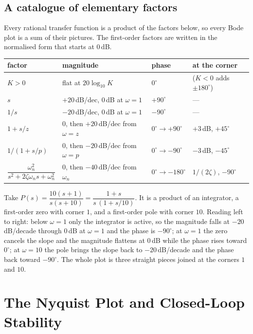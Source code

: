 \documentclass[11pt]{article}
\begin{document}
\subsection{A catalogue of elementary factors}\label{sec:catalogue}
Every rational transfer function is a product of the factors below, so every Bode
plot is a sum of their pictures. The first-order factors are written in the
normalised form that starts at $0$\,dB.

\begin{center}\small
\renewcommand{\arraystretch}{1.6}
\begin{tabular}{@{}llll@{}}
\toprule
factor & magnitude & phase & at the corner\\
\midrule
$K>0$ & flat at $20\log_{10}K$ & $0^\circ$ & ($K<0$ adds $\pm180^\circ$)\\
$s$ & $+20$\,dB/dec, $0$\,dB at $\omega=1$ & $+90^\circ$ & ---\\
$1/s$ & $-20$\,dB/dec, $0$\,dB at $\omega=1$ & $-90^\circ$ & ---\\
$1+s/z$ & $0$, then $+20$\,dB/dec from $\omega=z$ & $0^\circ\to+90^\circ$ & $+3$\,dB, $+45^\circ$\\
$1/(1+s/p)$ & $0$, then $-20$\,dB/dec from $\omega=p$ & $0^\circ\to-90^\circ$ & $-3$\,dB, $-45^\circ$\\
$\dfrac{\omega_n^{2}}{s^{2}+2\zeta\omega_n s+\omega_n^{2}}$ & $0$, then $-40$\,dB/dec from $\omega_n$ & $0^\circ\to-180^\circ$ & $1/(2\zeta)$, $-90^\circ$\\
\bottomrule
\end{tabular}
\end{center}

\begin{example}
Take $P(s)=\dfrac{10(s+1)}{s(s+10)}=\dfrac{1+s}{s\,(1+s/10)}$. It is a product of
an integrator, a first-order zero with corner $1$, and a first-order pole with corner
$10$. Reading left to right: below $\omega=1$ only the integrator is active, so the
magnitude falls at $-20$\,dB/decade through $0$\,dB at $\omega=1$ and the phase is
$-90^\circ$; at $\omega=1$ the zero cancels the slope and the magnitude flattens at
$0$\,dB while the phase rises toward $0^\circ$; at $\omega=10$ the pole brings the
slope back to $-20$\,dB/decade and the phase back toward $-90^\circ$. The whole
plot is three straight pieces joined at the corners $1$ and $10$.
\end{example}

\section{The Nyquist Plot and Closed-Loop Stability}\label{sec:nyquist}
\end{document}
